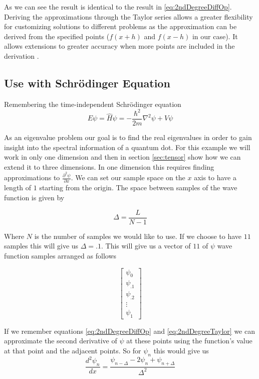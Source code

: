 \documentclass[authoryearcitations]{UoYCSproject}
\begin{document}
As we can see the result is identical to the result in \ref{eq:2ndDegreeDiffOp}. Deriving the approximations through
the Taylor series allows a greater flexibility for customizing solutions to different problems as the approximation
can be derived from the specified points ($f(x+h)$ and $f(x-h)$ in our case). It allows extensions to greater accuracy when
more points are included in the derivation \cite{cambridge}.  

\subsection{Use with Schr\"{o}dinger Equation}
\label{sec:useWithSchro}
Remembering the time-independent Schr\"{o}dinger equation
\begin{equation}
E\psi = \hat{H}\psi = -\frac{\hbar ^2}{2m}\nabla ^2\psi + V\psi \nonumber
\end{equation}

As an eigenvalue problem our goal is to find the real eigenvalues in order to gain insight into the spectral information
of a quantum dot. 
For this example we will work in only one dimension and then in section \ref{sec:tensor} show how we can extend
it to three dimensions. 
In one dimension this requires finding approximations to $\frac{\partial ^2 \psi}{\partial x}$. We can set our
sample space on the $x$ axis to have a length of $1$ starting from the origin. The space between samples of the 
wave function is given by

$$\Delta = \frac{L}{N - 1} $$

Where $N$ is the number of samples we would like to use. If we choose to have $11$ samples this will give us
$\Delta = .1$. This will give us a vector of $11$ of $\psi$ wave function samples arranged as follows 

$$\begin{bmatrix} 
        \psi _0  \\
        \psi _{.1}  \\
        \psi _{.2} \\
        \vdots    \\
        \psi _{1} 
   \end{bmatrix}
$$


If we remember equations \ref{eq:2ndDegreeDiffOp} and \ref{eq:2ndDegreeTaylor} we can approximate the second 
derivative of $\psi$ at these points
using the function's value at that point and the adjacent points. So for $\psi _{n}$ this would give us
$$\frac{d ^2 \psi _{n}}{dx} = \frac{\psi _{n-\Delta} - 2\psi _{n} + \psi _{n+\Delta}}{\Delta ^2} $$
\end{document}
